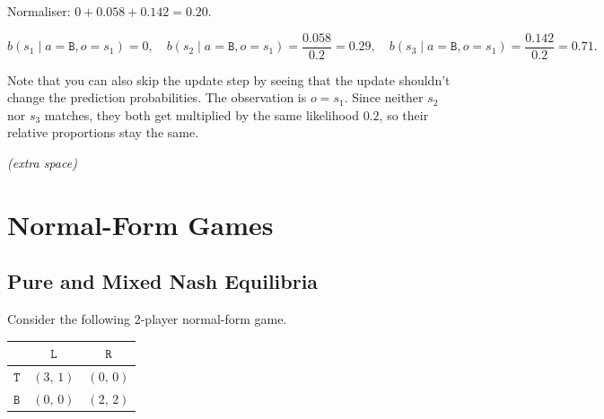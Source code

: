 \begin{enumerate}
\begin{solution}
Normaliser: $0 + 0.058 + 0.142 = 0.20$.

\[
  b(s_1 \mid a=\texttt{B}, o=s_1) = 0,\quad
  b(s_2 \mid a=\texttt{B}, o=s_1) = \frac{0.058}{0.2} = 0.29,\quad
  b(s_3 \mid a=\texttt{B}, o=s_1) = \frac{0.142}{0.2} = 0.71.
\]

Note that you can also skip the update step by seeing that the update shouldn't change the prediction probabilities. The observation is $o=s_1$. Since neither $s_2$ nor $s_3$ matches, they both get multiplied by the same likelihood $0.2$, so their relative proportions stay the same.

\end{solution}
\vspace{120pt}

\end{enumerate}

\clearpage

\begin{center}
    \textit{(extra space)}
\end{center}

\clearpage

\section{\points[20] Normal-Form Games}

\subsection{\points[8] Pure and Mixed Nash Equilibria}

Consider the following 2-player normal-form game.

\begin{table}[H]
\centering
\begin{tabular}{|c|c|c|}
\hline
              & $\texttt{L}$    & $\texttt{R}$    \\\hline
$\texttt{T}$  & $(3,\,1)$ & $(0,\,0)$ \\\hline
$\texttt{B}$  & $(0,\,0)$ & $(2,\,2)$ \\\hline
\end{tabular}
\end{table}

